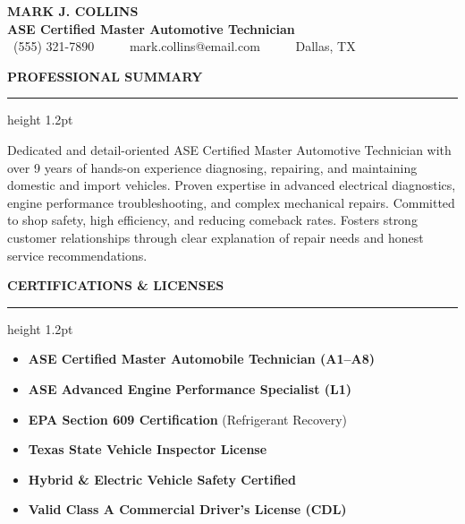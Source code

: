 \documentclass[10pt]{article}
\newcommand{\resumesection}[1]{%
  \vspace{6pt}%
  {\color{accent}\large\bfseries\MakeUppercase{#1}}%
  \vspace{1.5pt}%
  \hrule height 1.2pt%
  \vspace{3.5pt}%
}
\begin{document}
\color{textprimary}

\begin{center}
    {\Huge\bfseries\color{accent} MARK J. COLLINS} \\
    \vspace{2pt}
    {\large\bfseries\color{textsecondary} ASE Certified Master Automotive Technician} \\
    \vspace{3pt}
    \small \faPhone\ (555) 321-7890 \ \ \textbullet\ \ \faEnvelope\ mark.collins@email.com \ \ \textbullet\ \ \faMapMarker\ Dallas, TX
\end{center}

\vspace{1pt}

\resumesection{Professional Summary}
Dedicated and detail-oriented ASE Certified Master Automotive Technician with over 9 years of hands-on experience diagnosing, repairing, and maintaining domestic and import vehicles. Proven expertise in advanced electrical diagnostics, engine performance troubleshooting, and complex mechanical repairs. Committed to shop safety, high efficiency, and reducing comeback rates. Fosters strong customer relationships through clear explanation of repair needs and honest service recommendations.

\resumesection{Certifications \& Licenses}
\begin{minipage}[t]{0.48\textwidth}
\begin{itemize}[leftmargin=10pt, topsep=0pt, itemsep=1.5pt, parsep=0pt]
    \item \textbf{ASE Certified Master Automobile Technician (A1--A8)}
    \item \textbf{ASE Advanced Engine Performance Specialist (L1)}
    \item \textbf{EPA Section 609 Certification} (Refrigerant Recovery)
\end{itemize}
\end{minipage}
\hfill
\begin{minipage}[t]{0.48\textwidth}
\begin{itemize}[leftmargin=10pt, topsep=0pt, itemsep=1.5pt, parsep=0pt]
    \item \textbf{Texas State Vehicle Inspector License}
    \item \textbf{Hybrid \& Electric Vehicle Safety Certified}
    \item \textbf{Valid Class A Commercial Driver's License (CDL)}
\end{itemize}
\end{minipage}
\par
\end{document}
